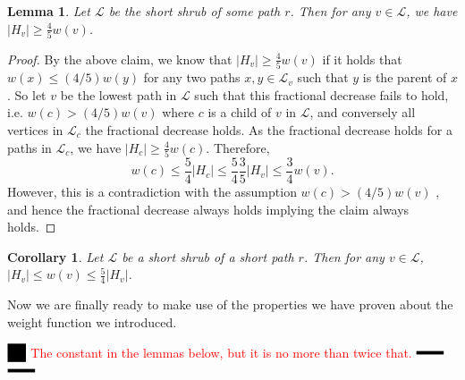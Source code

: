 \documentclass[11pt]{article}
\newtheorem{lemma}[theorem]{Lemma}
\newtheorem{corollary}[theorem]{Corollary}
\theoremstyle{definition}
\newcommand{\Lem}[1]{\hyperref[lem:#1]{Lemma~\ref*{lem:#1}}} %
\newcommand{\XSays}[2]{{
      {$\rule[-0.12cm]{0.2in}{0.5cm}$\fbox{\tt
            #1:} }
      \textcolor{red}{#2}
      \marginpar{\textcolor{blue}{#1}}
      {$\rule[0.1cm]{0.3in}{0.1cm}$\fbox{\tt
            end}$\rule[0.1cm]{0.3in}{0.1cm}$}
      }
   }
\newcommand{\Ben}[1]{{\XSays{Ben}{#1}}}
\begin{document}
\begin{lemma}
Let $\mathcal{L}$ be the short shrub of some path $r$.  
Then for any $v\in \mathcal{L}$, we have $|H_v|\geq \frac{4}{5} w(v)$.
\end{lemma}
% 
% 
%
\begin{proof}
By the above claim, we know that $|H_v|\geq \frac{4}{5} w(v)$ if it holds that 
$w(x)\leq (4/5) w(y)$ for any two paths $x,y\in \mathcal{L}_v$ such that $y$ is the parent of $x$.
So let $v$ be the lowest path in $\mathcal{L}$ such that this fractional decrease fails to hold, i.e. $w(c)> (4/5) w(v)$ 
where $c$ is a child of $v$ in $\mathcal{L}$, and conversely all vertices in $\mathcal{L}_c$ 
the fractional decrease holds.  As the fractional decrease holds for a paths in $\mathcal{L}_c$, 
we have $|H_c|\geq \frac{4}{5} w(c)$.  Therefore,
\[
w(c) \leq \frac{5}{4}|H_c| \leq \frac{5}{4} \frac{3}{5} |H_v| \leq \frac{3}{4} w(v).
\]
However, this is a contradiction with the assumption $w(c)> (4/5) w(v)$ , and hence the 
fractional decrease always holds implying the claim always holds.
\end{proof}

\begin{corollary}
\label{cor:equivalent}
 Let $\mathcal{L}$ be a short shrub of a short path $r$.  Then for any $v\in \mathcal{L}$, $|H_v| \leq w(v) \leq \frac{5}{4} |H_v|$.
\end{corollary}

Now we are finally ready to make use of the properties we have proven about the weight function we introduced.

\Ben{The constant in the lemmas below, but it is no more than twice that.}
\end{document}
